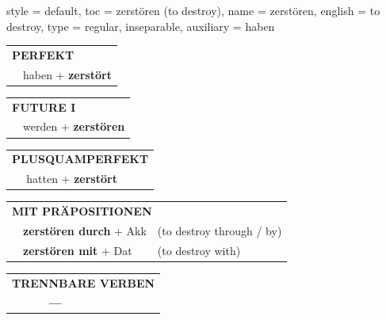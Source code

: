 \begin{verbentry}{
  style = {default},
  toc = {zerstören (to destroy)},
  name = {zerstören},
  english = {to destroy},
  type = {regular, inseparable},
  auxiliary = {haben}
}
 \begin{tabular}{rl}
     \multicolumn{2}{l}{\textbf{PERFEKT}}\\
   & haben + \textbf{zerstört}\\
  \end{tabular}
\hfill
   \begin{tabular}{rl}
    \multicolumn{2}{l}{\textbf{FUTURE I} }\\
   & werden + \textbf{zerstören}\\
  \end{tabular}
\hfill
   \begin{tabular}{rl}
      \multicolumn{2}{l}{\textbf{PLUSQUAMPERFEKT}}\\
   & hatten + \textbf{zerstört}\\
  \end{tabular}

   \vspace{10pt}

   \begin{tabular}{lll}
      \multicolumn{3}{l}{\textbf{MIT PRÄPOSITIONEN}}\\
& \textbf{zerstören durch} + Akk & (to destroy through / by)\\
& \textbf{zerstören mit} + Dat & (to destroy with)\\
\end{tabular}
  \hfill
   \begin{tabular}{lll}
\multicolumn{3}{l}{\textbf{TRENNBARE VERBEN}}\\
& \textbf{---} & \\
\end{tabular}

  \vspace{-5pt}
\end{verbentry}

